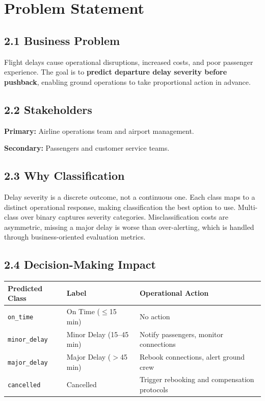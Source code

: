 \documentclass{article}
\newcommand{\code}[1]{\texttt{\small #1}}
\begin{document}
\section{\textcolor{accentblue}{Problem Statement}}

\subsection*{\textcolor{accentgold}{2.1 Business Problem}}

Flight delays cause operational disruptions, increased costs, and poor passenger experience. The goal is to \textbf{predict departure delay severity before pushback}, enabling ground operations to take proportional action in advance.

\subsection*{\textcolor{accentgold}{2.2 Stakeholders}}

\textbf{Primary:} Airline operations team and airport management.

\textbf{Secondary:} Passengers and customer service teams.

\subsection*{\textcolor{accentgold}{2.3 Why Classification}}

Delay severity is a discrete outcome, not a continuous one. Each class maps to a distinct operational response, making classification the best option to use. Multi-class over binary captures severity categories. Misclassification costs are asymmetric, missing a major delay is worse than over-alerting, which is handled through business-oriented evaluation metrics.

\subsection*{\textcolor{accentgold}{2.4 Decision-Making Impact}}

\vspace{0.3em}
\begin{tcolorbox}[mainbox, title={Operational Response by Predicted Class}]
\renewcommand{\arraystretch}{1.4}
\begin{tabularx}{\textwidth}{L{2.8cm} L{3cm} X}
    \toprule
    \textbf{Predicted Class} & \textbf{Label} & \textbf{Operational Action} \\
    \midrule
    \code{on\_time}     & On Time ($\leq$15 min)   & No action \\
    \code{minor\_delay} & Minor Delay (15--45 min)  & Notify passengers, monitor connections \\
    \code{major\_delay} & Major Delay ($>$45 min)  & Rebook connections, alert ground crew \\
    \code{cancelled}    & Cancelled                 & Trigger rebooking and compensation protocols \\
    \bottomrule
\end{tabularx}
\end{tcolorbox}
\end{document}
